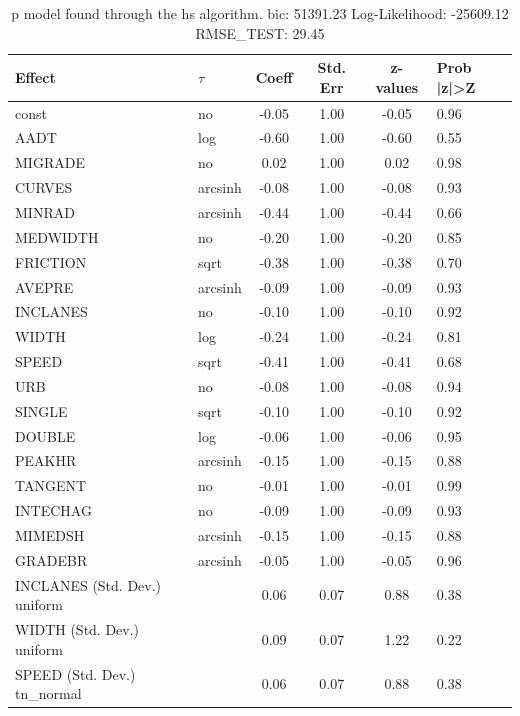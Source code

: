 \begin{table}
	\caption{p model found through the hs algorithm. bic: 51391.23 Log-Likelihood: -25609.12 RMSE_TEST: 29.45}
	\begin{center}
		\begin{tabular}{|l|l|c|c|c|l|}
			\hline
			Effect & $\tau$ & Coeff & Std. Err & z-values & Prob |z|>Z \\
			\hline
			const & no & -0.05 & 1.00 & -0.05 & 0.96 \\
			\hline
			AADT & log & -0.60 & 1.00 & -0.60 & 0.55 \\
			\hline
			MIGRADE & no & 0.02 & 1.00 & 0.02 & 0.98 \\
			\hline
			CURVES & arcsinh & -0.08 & 1.00 & -0.08 & 0.93 \\
			\hline
			MINRAD & arcsinh & -0.44 & 1.00 & -0.44 & 0.66 \\
			\hline
			MEDWIDTH & no & -0.20 & 1.00 & -0.20 & 0.85 \\
			\hline
			FRICTION & sqrt & -0.38 & 1.00 & -0.38 & 0.70 \\
			\hline
			AVEPRE & arcsinh & -0.09 & 1.00 & -0.09 & 0.93 \\
			\hline
			INCLANES & no & -0.10 & 1.00 & -0.10 & 0.92 \\
			\hline
			WIDTH & log & -0.24 & 1.00 & -0.24 & 0.81 \\
			\hline
			SPEED & sqrt & -0.41 & 1.00 & -0.41 & 0.68 \\
			\hline
			URB & no & -0.08 & 1.00 & -0.08 & 0.94 \\
			\hline
			SINGLE & sqrt & -0.10 & 1.00 & -0.10 & 0.92 \\
			\hline
			DOUBLE & log & -0.06 & 1.00 & -0.06 & 0.95 \\
			\hline
			PEAKHR & arcsinh & -0.15 & 1.00 & -0.15 & 0.88 \\
			\hline
			TANGENT & no & -0.01 & 1.00 & -0.01 & 0.99 \\
			\hline
			INTECHAG & no & -0.09 & 1.00 & -0.09 & 0.93 \\
			\hline
			MIMEDSH & arcsinh & -0.15 & 1.00 & -0.15 & 0.88 \\
			\hline
			GRADEBR & arcsinh & -0.05 & 1.00 & -0.05 & 0.96 \\
			\hline
			INCLANES (Std. Dev.) uniform &  & 0.06 & 0.07 & 0.88 & 0.38 \\
			\hline
			WIDTH (Std. Dev.) uniform &  & 0.09 & 0.07 & 1.22 & 0.22 \\
			\hline
			SPEED (Std. Dev.) tn_normal &  & 0.06 & 0.07 & 0.88 & 0.38 \\

\end{tabular}
\end{center}
\end{table}
